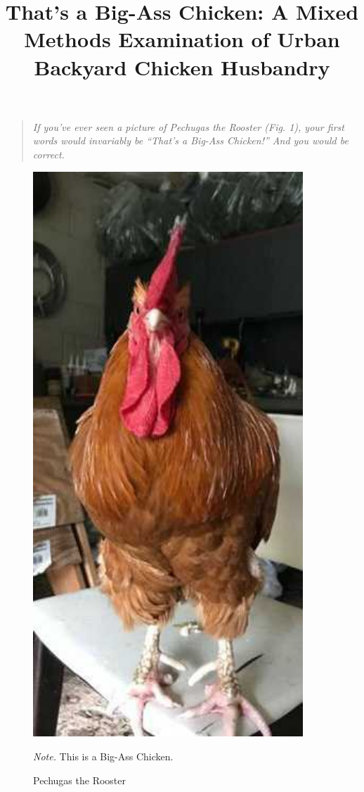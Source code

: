 \documentclass[
  man,
  floatsintext,
  longtable,
  nolmodern,
  notxfonts,
  notimes,
  colorlinks=true,linkcolor=blue,citecolor=blue,urlcolor=blue]{apa7}
\title{That's a Big-Ass Chicken: A Mixed Methods Examination of Urban
Backyard Chicken Husbandry}
\affiliation{
{Department of Psychology, The University of Chicago}}
\begin{document}
\maketitle


\setcounter{secnumdepth}{-\maxdimen} %

\setlength\LTleft{0pt}


\begin{quote}
\emph{If you've ever seen a picture of Pechugas the Rooster (Fig. 1),
your first words would invariably be ``That's a Big-Ass Chicken!'' And
you would be correct.}
\end{quote}

\begin{figure}[!htbp]

{\caption{{Pechugas the Rooster}{\label{fig-myimportedimage}}}}

\includegraphics[width=4in,height=\textheight,keepaspectratio]{Images_BigAssChicken/orpignton rooster.jpg}

{\noindent \emph{Note.} This is a Big-Ass Chicken.}

\end{figure}
\end{document}
